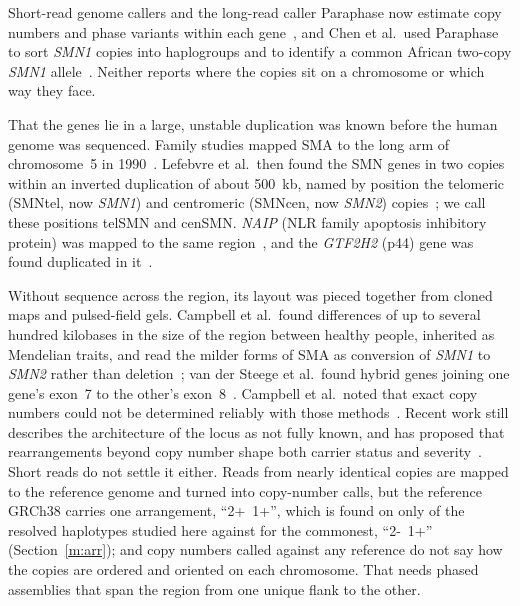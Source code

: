 \documentclass[10pt]{article}
\begin{document}
Short-read genome callers and the long-read caller
Paraphase now estimate copy numbers and phase variants within each gene~\cite{chen2020,chen2023}, and Chen et al.\
used Paraphase to sort \emph{SMN1} copies into haplogroups and to identify a common African two-copy \emph{SMN1}
allele~\cite{chen2023}. Neither reports where the copies sit on a chromosome or which way they face.

That the genes lie in a large, unstable duplication was known before the human genome was sequenced. Family studies
mapped SMA to the long arm of chromosome~5 in 1990~\cite{brzustowicz1990,melki1990,gilliam1990}. Lefebvre et al.\ then found the
SMN genes in two copies within an inverted duplication of about 500~kb, named by position the telomeric (SMNtel, now
\emph{SMN1}) and centromeric (SMNcen, now \emph{SMN2}) copies~\cite{lefebvre1995}; we call these positions telSMN and cenSMN. \emph{NAIP} (NLR family apoptosis inhibitory protein) was mapped to the same region~\cite{roy1995}, and the
\emph{GTF2H2} (p44) gene was found duplicated in it~\cite{burglen1997}.

Without sequence across
the region, its layout was pieced together from cloned maps and pulsed-field gels. Campbell et al.\ found differences
of up to several hundred kilobases in the size of the region between healthy people, inherited as Mendelian traits,
and read the milder forms of SMA as conversion of \emph{SMN1} to \emph{SMN2} rather than deletion~\cite{campbell1997};
van der Steege et al.\ found hybrid genes joining one gene's exon~7 to the other's exon~8~\cite{vandersteege1996}.
Campbell et al.\ noted that exact copy numbers could not be determined reliably with those methods~\cite{campbell1997}. Recent work still describes
the architecture of the locus as not fully known, and has proposed that rearrangements beyond copy number shape both
carrier status and severity~\cite{vorster2020,wadman2020,berzal2026}. Short reads do not settle it
either. Reads from nearly identical copies are mapped to the reference genome and turned into copy-number calls, but the
reference GRCh38 carries one arrangement, ``2+~1+'', which is found on only \arrRefN{} of the \nHapsRes{} resolved
haplotypes studied here against \arrTopN{} for the commonest, ``2-~1+'' (Section~\ref{m:arr}); and copy numbers called
against any reference do not say how the copies are ordered and oriented on each chromosome. That needs phased
assemblies that span the region from one unique flank to the other.
\end{document}
